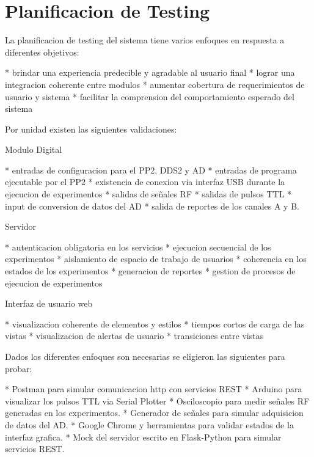 \section{Planificacion de Testing}

La planificacion de testing del sistema tiene varios enfoques en respuesta a diferentes objetivos:

    * brindar una experiencia predecible y agradable al usuario final
    * lograr una integracion coherente entre modulos
    * aumentar cobertura de requerimientos de usuario y sistema
    * facilitar la comprension del comportamiento esperado del sistema

Por unidad existen las siguientes validaciones:

    Modulo Digital
        
        * entradas de configuracion para el PP2, DDS2 y AD
        * entradas de programa ejecutable por el PP2
        * existencia de conexion via interfaz USB durante la ejecucion de experimentos
        * salidas de señales RF
        * salidas de pulsos TTL
        * input de conversion de datos del AD
        * salida de reportes de los canales A y B.

    Servidor

        * autenticacion obligatoria en los servicios
        * ejecucion secuencial de los experimentos
        * aislamiento de espacio de trabajo de usuarios
        * coherencia en los estados de los experimentos
        * generacion de reportes
        * gestion de procesos de ejecucion de experimentos

    Interfaz de usuario web

        * visualizacion coherente de elementos y estilos
        * tiempos cortos de carga de las vistas
        * visualizacion de alertas de usuario
        * transiciones entre vistas

Dados los diferentes enfoques son necesarias se eligieron las siguientes para probar:

    * Postman para simular comunicacion http con servicios REST
    * Arduino para visualizar los pulsos TTL via Serial Plotter
    * Osciloscopio para medir señales RF generadas en los experimentos.
    * Generador de señales para simular adquisicion de datos del AD.
    * Google Chrome y herramientas para validar estados de la interfaz grafica.
    * Mock del servidor escrito en Flask-Python para simular servicios REST.

    \newpage